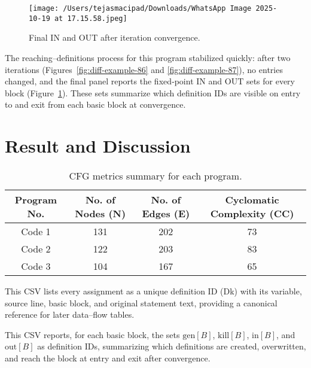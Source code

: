 \documentclass[12pt, a4paper]{report}
\begin{document}
\begin{figure}[H]
\centering
\texttt{[image: /Users/tejasmacipad/Downloads/WhatsApp Image 2025-10-19 at 17.15.58.jpeg]}
\caption{Final IN and OUT after iteration convergence.}
\label{fig:diff-example-88}
\end{figure}

\noindent
The reaching–definitions process for this program stabilized quickly: after two iterations (Figures~\ref{fig:diff-example-86} and \ref{fig:diff-example-87}), no entries changed, and the final panel reports the fixed‑point \(\mathrm{IN}\) and \(\mathrm{OUT}\) sets for every block (Figure~\ref{fig:diff-example-88}). These sets summarize which definition IDs are visible on entry to and exit from each basic block at convergence.


\section{Result and Discussion}

\begin{table}[H]
\centering
\renewcommand{\arraystretch}{1.2}
\setlength{\tabcolsep}{10pt}
\begin{tabular}{|c|c|c|c|}
\hline
\textbf{Program No.} & \textbf{No. of Nodes (N)} & \textbf{No. of Edges (E)} & \textbf{Cyclomatic Complexity (CC)} \\
\hline
Code 1 & 131 & 202 & 73 \\
Code 2 & 122 & 203 & 83 \\
Code 3 & 104 & 167 & 65 \\
\hline
\end{tabular}
\caption{CFG metrics summary for each program.}
\label{tab:cfg-metrics}
\end{table}

\noindent
This CSV lists every assignment as a unique definition ID (Dk) with its variable, source line, basic block, and original statement text, providing a canonical reference for later data–flow tables.

\noindent
This CSV reports, for each basic block, the sets \(\mathrm{gen}[B]\), \(\mathrm{kill}[B]\), \(\mathrm{in}[B]\), and \(\mathrm{out}[B]\) as definition IDs, summarizing which definitions are created, overwritten, and reach the block at entry and exit after convergence.
\end{document}
